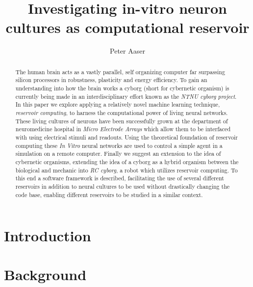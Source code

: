 \documentclass[journal]{IEEEtran}
\begin{document}
\title{Investigating in-vitro neuron cultures as computational reservoir}

\author{Peter Aaser}
%
\maketitle

\begin{abstract}
  The human brain acts as a vastly parallel, self organizing computer far
  surpassing silicon processors in robustness, plasticity and energy
  efficiency.
  To gain an understanding into how the brain works a cyborg (short for
  cybernetic organism) is currently being made in an interdisciplinary effort
  known as the \textit{NTNU cyborg project}.
  In this paper we explore applying a relatively novel machine learning
  technique, \textit{reservoir computing}, to harness the computational power of
  living neural networks.
  These living cultures of neurons have been successfully grown at the
  department of neuromedicine hospital in \textit{Micro Electrode Arrays} which
  allow them to be interfaced with using electrical stimuli and readouts.
  Using the theoretical foundation of reservoir computing these \textit{In
    Vitro} neural networks are used to control a simple agent in a simulation on
  a remote computer.
  Finally we suggest an extension to the idea of cybernetic organisms, extending
  the idea of a cyborg as a hybrid organism between the biological and mechanic
  into \textit{RC cyborg}, a robot which utilizes reservoir computing.
  To this end a software framework is described, facilitating the use of several
  different reservoirs in addition to neural cultures to be used without
  drastically changing the code base, enabling different reservoirs to be
  studied in a similar context.
\end{abstract}


\section{Introduction}

\section{Background}

\end{document}
